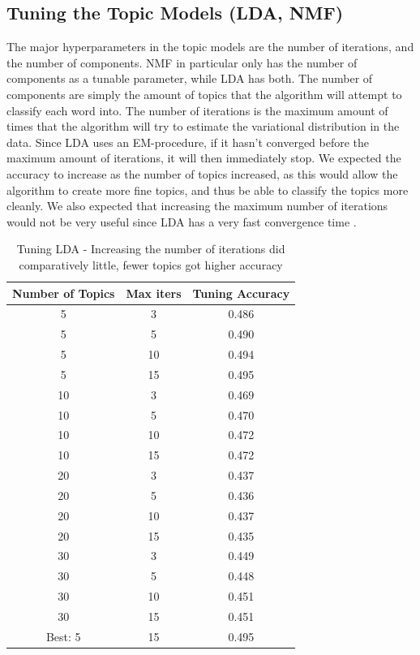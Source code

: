\documentclass{article}
\begin{document}
\subsection{Tuning the Topic Models (LDA, NMF)}
The major hyperparameters in the topic models are the number of iterations, and the number of components. NMF in particular only has the number of components as a tunable parameter, while LDA has both. The number of components are simply the amount of topics that the algorithm will attempt to classify each word into. The number of iterations is the maximum amount of times that the algorithm will try to estimate the variational distribution in the data. Since LDA uses an EM-procedure, if it hasn't converged before the maximum amount of iterations, it will then immediately stop. We expected the accuracy to increase as the number of topics increased, as this would allow the algorithm to create more fine topics, and thus be able to classify the topics more cleanly. We also expected that increasing the maximum number of iterations would not be very useful since LDA has a very fast convergence time \cite{lda}. 
\begin{table}[!ht]
    \begin{center}
\begin{tabular}{|c|c|c|}
    
    \hline
    Number of Topics & Max iters & Tuning Accuracy \\
    \hline
    5 & 3 & 0.486 \\
    5 & 5 & 0.490 \\
    5 & 10 & 0.494 \\
    5 & 15 & 0.495 \\
    10 & 3 & 0.469 \\
    10 & 5 & 0.470 \\
    10 & 10 & 0.472 \\
    10 & 15 & 0.472 \\
    20 & 3 & 0.437 \\
    20 & 5 &0.436 \\
    20 & 10 & 0.437 \\
    20 & 15 & 0.435 \\
    30 & 3 & 0.449 \\
    30 & 5 & 0.448 \\
    30 & 10 & 0.451 \\
    30 & 15 & 0.451 \\
    \hline
    Best: 5 & 15 & 0.495 \\
    \hline
\end{tabular}
\end{center}
    \caption{Tuning LDA - Increasing the number of iterations did comparatively little, fewer topics got higher accuracy}
    \label{tab:tuning_lda}
\end{table}
\end{document}
